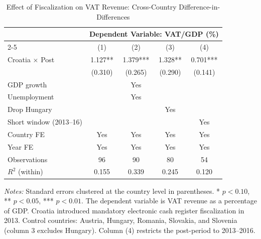 \begin{table}[htbp]
\centering
\caption{Effect of Fiscalization on VAT Revenue: Cross-Country Difference-in-Differences}
\label{tab:main_did}
\begin{tabular}{lcccc}
\hline\hline
 & \multicolumn{4}{c}{Dependent Variable: VAT/GDP (\%)} \\
\cmidrule(lr){2-5}
 & (1) & (2) & (3) & (4) \\
\hline
Croatia $\times$ Post & 1.127** & 1.379*** & 1.328** & 0.701*** \\
 & (0.310) & (0.265) & (0.290) & (0.141) \\
GDP growth &  & Yes &  &  \\
Unemployment &  & Yes &  &  \\
Drop Hungary &  &  & Yes &  \\
Short window (2013--16) &  &  &  & Yes \\
\hline
Country FE & Yes & Yes & Yes & Yes \\
Year FE & Yes & Yes & Yes & Yes \\
Observations & 96 & 90 & 80 & 54 \\
$R^2$ (within) & 0.155 & 0.339 & 0.245 & 0.120 \\
\hline\hline
\end{tabular}
\begin{tablenotes}[flushleft]
\footnotesize
\item \textit{Notes:} Standard errors clustered at the country level in parentheses. * $p < 0.10$, ** $p < 0.05$, *** $p < 0.01$. The dependent variable is VAT revenue as a percentage of GDP. Croatia introduced mandatory electronic cash register fiscalization in 2013. Control countries: Austria, Hungary, Romania, Slovakia, and Slovenia (column 3 excludes Hungary). Column (4) restricts the post-period to 2013--2016.
\end{tablenotes}
\end{table}

